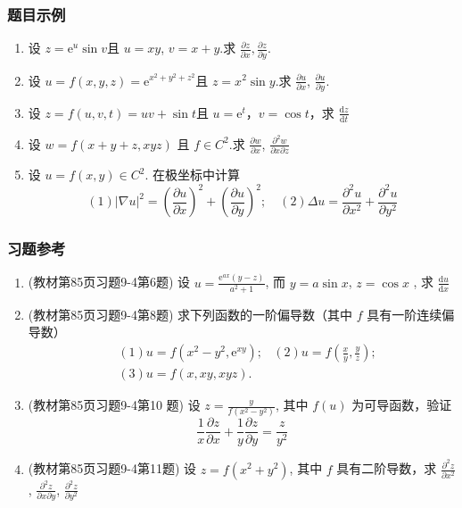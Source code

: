 \subsubsection{题目示例}
\begin{enumerate}
    \item 设 $z = \mathrm{e} ^u \sin v$且 $u = xy$, $v = x+y$.求 $\frac{\partial z}{\partial x}, \frac{\partial z}{\partial y}.$
    
    \item 设 $u = f(x,y,z) = \mathrm{e} ^{x^2 + y^2 + z^2}$且 $z = x^2 \sin y$.求 $\frac{\partial u}{\partial x}$, $\frac{\partial u}{\partial y}$.
    
    \item 设 $z = f(u,v,t) = u v+ \sin t$且 $u = \mathrm{e}^t$，$v = \cos t$，求 $\frac{\mathrm{d} z}{ \mathrm{d} t}$
    
    \item 设 $w = f(x+y+z, xyz)$ 且 $f \in C^2$.求 $\frac{\partial w}{\partial x}$, $\frac{\partial ^2 w}{\partial x \partial z}$
    
    \item 设 $u=f(x,y) \in  C^2$. 在极坐标中计算
    $$
    (1) |\nabla u|^2 = \left( \frac{\partial u}{\partial x} \right)^2 + \left( \frac{\partial u}{\partial y} \right)^2 ; \quad (2) \Delta u = \frac{\partial ^2 u}{\partial x^2} + \frac{\partial ^2 u}{\partial y^2}
    $$
\end{enumerate}
\subsubsection{习题参考}
\begin{enumerate}
    \item (教材第85页习题9-4第6题) 设 $ u = \frac{\mathrm{e}^{ax} (y-z)}{a^2+1}$, 而 $y=a \sin x$, $z = \cos x$ , 求 $\frac{\mathrm{d} u}{ \mathrm{d} x}$

    \item (教材第85页习题9-4第8题) 求下列函数的一阶偏导数（其中 $f$ 具有一阶连续偏导数）
    \begin{align*}
        &(1) u = f(x^2-y^2, \mathrm{e} ^{xy}) ; & (2) u = f\left(\frac{x}{y},\frac{y}{z} \right); \\
     &(3) u = f(x,xy,xyz).
    \end{align*}

    \item (教材第85页习题9-4第10 题) 设 $z = \frac{y}{f(x^2 - y^2)}$, 其中 $f(u)$ 为可导函数，验证
    $$
    \frac{1}{x} \frac{\partial z}{\partial x} + \frac{1}{y}\frac{\partial z}{\partial y} = \frac{z}{y^2}
    $$

    \item (教材第85页习题9-4第11题) 设 $z = f(x^2+y^2)$, 其中 $f$ 具有二阶导数，求 $\frac{\partial ^2 z}{\partial x^2}$ , $\frac{\partial ^2 z}{\partial x \partial y}$, $\frac{\partial ^2 z}{\partial y^2}$
\end{enumerate}

